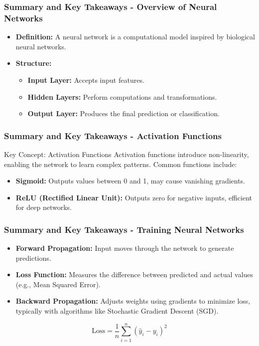\documentclass[aspectratio=169]{beamer}
\begin{document}
\begin{frame}[fragile]
  \frametitle{Summary and Key Takeaways - Overview of Neural Networks}
  \begin{itemize}
    \item \textbf{Definition:} A neural network is a computational model inspired by biological neural networks.
    \item \textbf{Structure:}
    \begin{itemize}
      \item \textbf{Input Layer:} Accepts input features.
      \item \textbf{Hidden Layers:} Perform computations and transformations.
      \item \textbf{Output Layer:} Produces the final prediction or classification.
    \end{itemize}
  \end{itemize}
\end{frame}

\begin{frame}[fragile]
  \frametitle{Summary and Key Takeaways - Activation Functions}
  \begin{block}{Key Concept: Activation Functions}
    Activation functions introduce non-linearity, enabling the network to learn complex patterns. Common functions include:
    \begin{itemize}
      \item \textbf{Sigmoid:} Outputs values between 0 and 1, may cause vanishing gradients.
      \item \textbf{ReLU (Rectified Linear Unit):} Outputs zero for negative inputs, efficient for deep networks.
    \end{itemize}
  \end{block}
\end{frame}

\begin{frame}[fragile]
  \frametitle{Summary and Key Takeaways - Training Neural Networks}
  \begin{itemize}
    \item \textbf{Forward Propagation:} Input moves through the network to generate predictions.
    \item \textbf{Loss Function:} Measures the difference between predicted and actual values (e.g., Mean Squared Error).
    \item \textbf{Backward Propagation:} Adjusts weights using gradients to minimize loss, typically with algorithms like Stochastic Gradient Descent (SGD).
  \end{itemize}

  \begin{equation}
    \text{Loss} = \frac{1}{n} \sum_{i=1}^{n} (\hat{y}_i - y_i)^2 
  \end{equation}
\end{frame}
\end{document}
